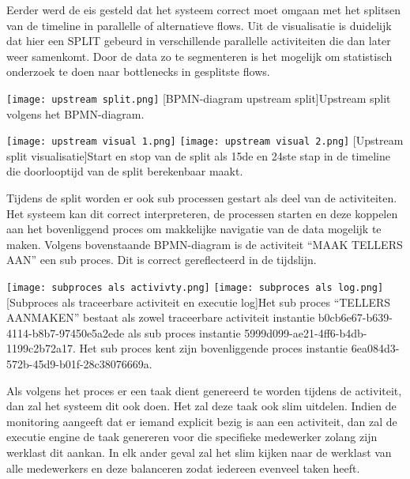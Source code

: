 Eerder werd de eis gesteld dat het systeem correct moet omgaan met het splitsen van de timeline in parallelle of alternatieve flows. Uit de visualisatie is duidelijk dat hier een SPLIT gebeurd in verschillende parallelle activiteiten die dan later weer samenkomt. Door de data zo te segmenteren is het mogelijk om statistisch onderzoek te doen naar bottlenecks in gesplitste flows.

\begin{center}
  \captionsetup{type=figure}
  \texttt{[image: upstream split.png]}
  [BPMN-diagram upstream split]{Upstream split volgens het BPMN-diagram.}
\end{center}

 
\begin{center}
  \captionsetup{type=figure}
  \texttt{[image: upstream visual 1.png]}
  \texttt{[image: upstream visual 2.png]}
  [Upstream split visualisatie]{Start en stop van de split als 15de en 24ste stap in de timeline die doorlooptijd van de split berekenbaar maakt.}
\end{center}

Tijdens de split worden er ook sub processen gestart als deel van de activiteiten. Het systeem kan dit correct interpreteren, de processen starten en deze koppelen aan het bovenliggend proces om makkelijke navigatie van de data mogelijk te maken. Volgens bovenstaande BPMN-diagram is de activiteit “MAAK TELLERS AAN” een sub proces. Dit is correct gereflecteerd in de tijdslijn.

\begin{center}
  \captionsetup{type=figure}
  \texttt{[image: subproces als activivty.png]}
  \texttt{[image: subproces als log.png]}
  [Subproces als traceerbare activiteit en executie log]{Het sub proces “TELLERS AANMAKEN” bestaat als zowel traceerbare activiteit instantie b0cb6e67-b639-4114-b8b7-97450e5a2ede als sub proces instantie 5999d099-ae21-4ff6-b4db-1199c2b72a17. Het sub proces kent zijn bovenliggende proces instantie 6ea084d3-572b-45d9-b01f-28c38076669a.}
\end{center}
 
Als volgens het proces er een taak dient genereerd te worden tijdens de activiteit, dan zal het systeem dit ook doen. Het zal deze taak ook slim uitdelen. Indien de monitoring aangeeft dat er iemand explicit bezig is aan een activiteit, dan zal de executie engine de taak genereren voor die specifieke medewerker zolang zijn werklast dit aankan. In elk ander geval zal het slim kijken naar de werklast van alle medewerkers en deze balanceren zodat iedereen evenveel taken heeft. \newline

